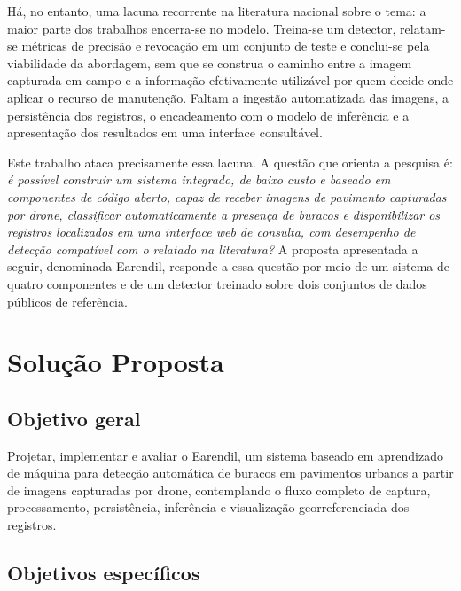 \documentclass[12pt]{article}
\begin{document}
Há, no entanto, uma lacuna recorrente na literatura nacional sobre o
tema: a maior parte dos trabalhos encerra-se no modelo. Treina-se um
detector, relatam-se métricas de precisão e revocação em um conjunto de
teste e conclui-se pela viabilidade da abordagem, sem que se construa o
caminho entre a imagem capturada em campo e a informação efetivamente
utilizável por quem decide onde aplicar o recurso de manutenção. Faltam a
ingestão automatizada das imagens, a persistência dos registros, o
encadeamento com o modelo de inferência e a apresentação dos resultados
em uma interface consultável.

Este trabalho ataca precisamente essa lacuna. A questão que orienta a
pesquisa é: \emph{é possível construir um sistema integrado, de baixo
custo e baseado em componentes de código aberto, capaz de receber imagens
de pavimento capturadas por drone, classificar automaticamente a presença
de buracos e disponibilizar os registros localizados em uma interface web
de consulta, com desempenho de detecção compatível com o relatado na
literatura?} A proposta apresentada a seguir, denominada Earendil,
responde a essa questão por meio de um sistema de quatro componentes e de
um detector treinado sobre dois conjuntos de dados públicos de
referência.

\section{Solução Proposta}
\label{sec:solucao}

\subsection{Objetivo geral}
\label{sec:objetivo-geral}

Projetar, implementar e avaliar o Earendil, um sistema baseado em
aprendizado de máquina para detecção automática de buracos em pavimentos
urbanos a partir de imagens capturadas por drone, contemplando o fluxo
completo de captura, processamento, persistência, inferência e
visualização georreferenciada dos registros.

\subsection{Objetivos específicos}
\label{sec:objetivos-especificos}
\end{document}
